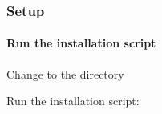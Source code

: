 \documentclass[a4paper,10pt,english]{report}
\begin{document}
\subsubsection{Setup}
\label{\detokenize{user/general/installation:setup}}\label{\detokenize{user/general/installation:installation-setup}}

\paragraph{Run the installation script}
\label{\detokenize{user/general/installation:run-the-installation-script}}
Change to the  directory

Run the installation script:

\begin{sphinxVerbatim}[commandchars=\\\{\}]
 
\end{sphinxVerbatim}
\end{document}
